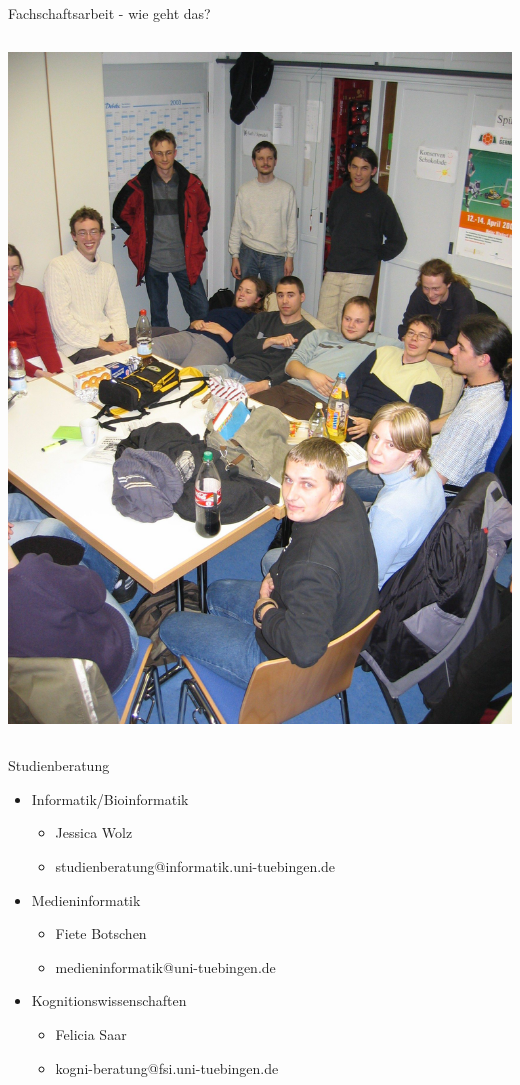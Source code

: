 \documentclass{beamer}
\begin{document}
\begin{frame}{Fachschaftsarbeit - wie geht das?}
\begin{columns}
\begin{column}{0.5\linewidth}
				\includegraphics[width=\linewidth]{Sitzung.jpg}
			\end{column}
		\end{columns}
	\end{frame}
	
	\begin{frame}{Studienberatung}
			\begin{itemize}
				\item Informatik/Bioinformatik
					\begin{itemize}
					\item Jessica Wolz
					\item studienberatung@informatik.uni-tuebingen.de
					\end{itemize}
				\item Medieninformatik
				\begin{itemize}
					\item Fiete Botschen
					\item medieninformatik@uni-tuebingen.de
				\end{itemize}
				\item Kognitionswissenschaften
					\begin{itemize}
						\item Felicia Saar
						\item kogni-beratung@fsi.uni-tuebingen.de
					\end{itemize}
			\end{itemize}
	\end{frame}
\end{document}
